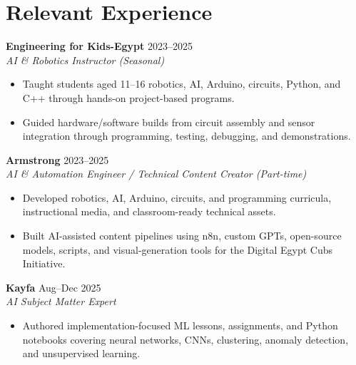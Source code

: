 \documentclass[letterpaper]{article}
\newcommand{\roleline}[3]{\textbf{#1} \hfill #2 \\\textit{#3} \\}
\begin{document}
\section*{Relevant Experience}
\roleline{Engineering for Kids-Egypt}{2023--2025}{AI \& Robotics Instructor (Seasonal)}
\begin{itemize}
\item Taught students aged 11--16 robotics, AI, Arduino, circuits, Python, and C++ through hands-on project-based programs.
\item Guided hardware/software builds from circuit assembly and sensor integration through programming, testing, debugging, and demonstrations.
\end{itemize}
\roleline{Armstrong}{2023--2025}{AI \& Automation Engineer / Technical Content Creator (Part-time)}
\begin{itemize}
\item Developed robotics, AI, Arduino, circuits, and programming curricula, instructional media, and classroom-ready technical assets.
\item Built AI-assisted content pipelines using n8n, custom GPTs, open-source models, scripts, and visual-generation tools for the Digital Egypt Cubs Initiative.
\end{itemize}
\roleline{Kayfa}{Aug--Dec 2025}{AI Subject Matter Expert}
\begin{itemize}
\item Authored implementation-focused ML lessons, assignments, and Python notebooks covering neural networks, CNNs, clustering, anomaly detection, and unsupervised learning.
\end{itemize}
\end{document}
